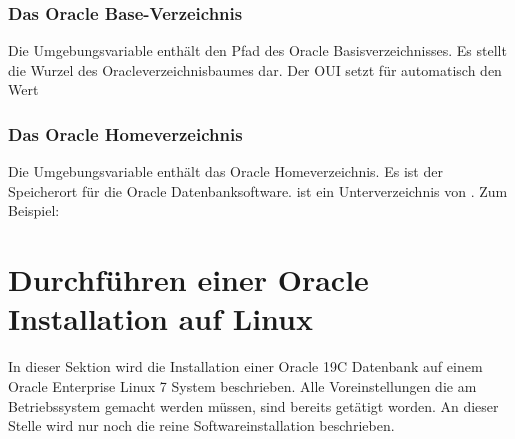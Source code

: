         \subsubsection{Das Oracle Base-Verzeichnis}
          Die Umgebungsvariable  enthält den Pfad des Oracle Basisverzeichnisses. Es stellt die Wurzel des Oracleverzeichnisbaumes dar. Der OUI setzt für  automatisch den Wert


        \subsubsection{Das Oracle Homeverzeichnis}
          Die Umgebungsvariable  enthält das Oracle Homeverzeichnis. Es ist der Speicherort für die Oracle Datenbanksoftware.  ist ein Unterverzeichnis von . Zum Beispiel:


          \begin{literaturinternet}
            \item \cite{BABHAIIJ}
          \end{literaturinternet}

    \section{Durchführen einer Oracle Installation auf Linux}
      In dieser Sektion wird die Installation einer Oracle 19C Datenbank auf einem Oracle Enterprise Linux 7 System beschrieben. Alle Voreinstellungen die am Betriebssystem gemacht werden müssen, sind bereits getätigt worden. An dieser Stelle wird nur noch die reine Softwareinstallation beschrieben.
